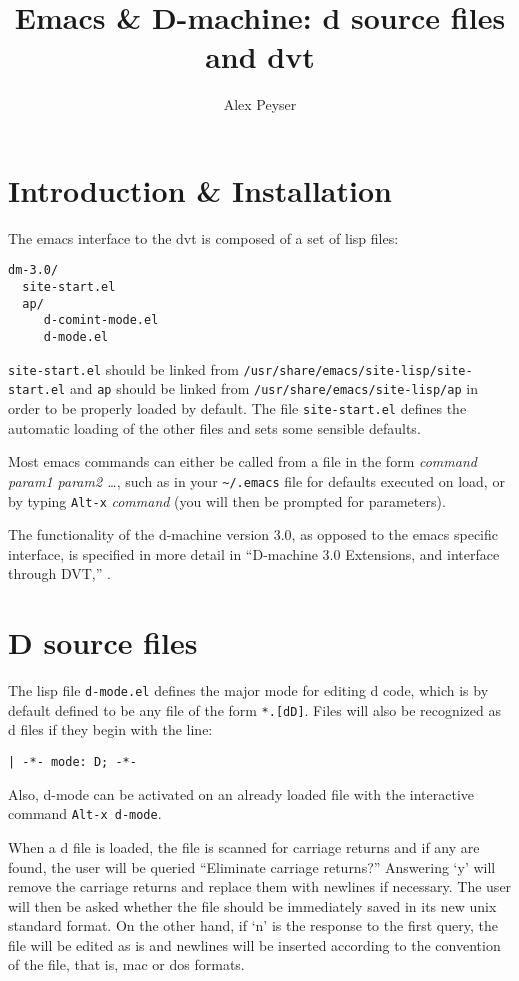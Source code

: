 \documentclass[12pt]{article}
\title{
  Emacs \& D-machine: d source files and dvt\\
  \titleversion
}
\author{Alex Peyser}
\begin{document}
\maketitle
{}\tableofcontents{}
\newpage
\setlength{\parindent}{0pt}
\setlength{\parskip}{6pt}
\section{Introduction \& Installation}

The emacs interface to the dvt is composed of a set of lisp files:
\begin{verbatim}
dm-3.0/
  site-start.el
  ap/
     d-comint-mode.el
     d-mode.el
\end{verbatim}
\texttt{site-start.el} should be linked from
\texttt{/usr/share/emacs/site-lisp/site-start.el} and \texttt{ap}
should be linked from \texttt{/usr/share/emacs/site-lisp/ap} in order
to be properly loaded by default. The file \texttt{site-start.el}
defines the automatic loading of the other files and sets some
sensible defaults.
  
Most emacs commands can either be called from a file in the form
\emph{command param1 param2 \dots}, such as in your
{\tt\verb$~/.$emacs} file for defaults executed on load, or by typing
\verb$Alt-x$ \emph{command} (you will then be prompted for
parameters).

The functionality of the d-machine version 3.0, as opposed to the
emacs specific interface, is specified in more detail in ``D-machine
3.0 Extensions, and interface through DVT,'' \citep{dvt-3.0}.

\section{D source files}
  
The lisp file \texttt{d-mode.el} defines the major mode for editing d
code, which is by default defined to be any file of the form
\verb$*.[dD]$.  Files will also be recognized as d files if they begin
with the line:
\begin{verbatim}
| -*- mode: D; -*-
\end{verbatim}
Also, d-mode can be activated on an already loaded file with the interactive
command \verb$Alt-x d-mode$.

When a d file is loaded, the file is scanned for carriage returns and
if any are found, the user will be queried ``Eliminate carriage
returns?'' Answering `y' will remove the carriage returns and replace
them with newlines if necessary. The user will then be asked whether
the file should be immediately saved in its new unix standard format.
On the other hand, if `n' is the response to the first query, the file
will be edited as is and newlines will be inserted according to the
convention of the file, that is, mac or dos formats.
\end{document}
